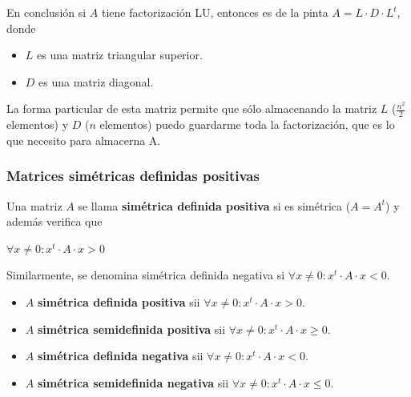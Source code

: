 \documentclass[]{article}
\begin{document}
En conclusión si $A$ tiene factorización LU, entonces es de la pinta $A=L\cdot D \cdot L^t$, donde
\begin{itemize}
	\item $L$ es una matriz triangular superior.
	\item $D$ es una matriz diagonal.
\end{itemize}

La forma particular de esta matriz permite que sólo almacenando la matriz $L$ ($\frac{n^2}{2}$ elementos) y $D$ ($n$ elementos) puedo guardarme toda la factorización, que es lo que necesito para almacerna A.

\subsubsection{Matrices simétricas definidas positivas}
\begin{defi}
	Una matriz $A$ se llama \textbf{simétrica definida positiva} si es simétrica ($A = A^t$) y además verifica que
	\begin{center}
		$\forall x\neq 0 : x^t \cdot A \cdot x > 0$
	\end{center}

	Similarmente, se denomina simétrica definida negativa si $\forall x\neq 0 : x^t \cdot A \cdot x < 0$.

	\begin{itemize}
		\item $A$ \textbf{simétrica definida positiva} sii $\forall x\neq 0 : x^t \cdot A \cdot x > 0$.
		\item $A$ \textbf{simétrica semidefinida positiva} sii $\forall x\neq 0 : x^t \cdot A \cdot x \geq 0$.
		\item $A$ \textbf{simétrica definida negativa} sii $\forall x\neq 0 : x^t \cdot A \cdot x < 0$.
		\item $A$ \textbf{simétrica semidefinida negativa} sii $\forall x\neq 0 : x^t \cdot A \cdot x \leq 0$.
	\end{itemize}
\end{defi}
\end{document}
